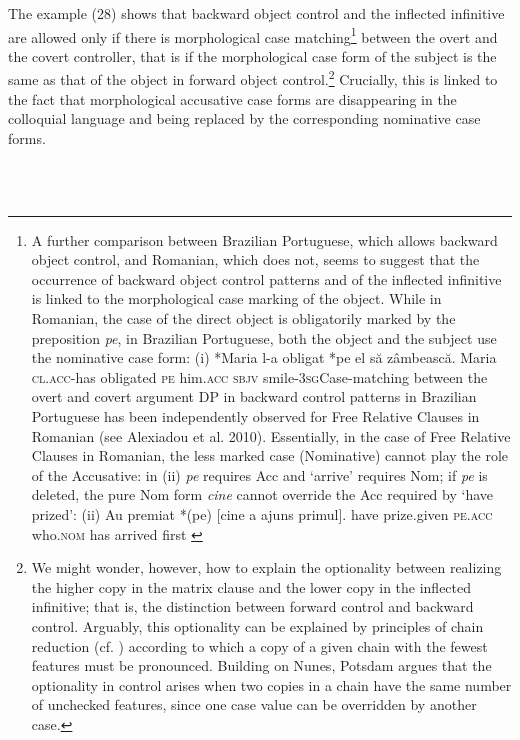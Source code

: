 \documentclass[output=paper]{langsci/langscibook}
\begin{document}
The example (28) shows that backward object control and the inflected infinitive are allowed only if there is morphological case matching\footnote{A further comparison between Brazilian Portuguese, which allows backward object control, and Romanian, which does not, seems to suggest that the occurrence of backward object control patterns and of the inflected infinitive is linked to the morphological case marking of the object. While in Romanian, the case of the direct object is obligatorily marked by the preposition \textit{pe}, in Brazilian Portuguese, both the object and the subject use the nominative case form: (i)  *Maria  l-a     obligat     *pe el            să      zâmbească.  Maria  \textsc{cl.acc}{}-has        obligated     \textsc{pe} him\textsc{.acc} \textsc{sbjv} smile\textsc{{}-3sg}Case-matching between the overt and covert argument DP in backward control patterns in Brazilian Portuguese has been independently observed for Free Relative Clauses in Romanian (see Alexiadou et al. 2010). Essentially, in the case of Free Relative Clauses in Romanian, the less marked case (Nominative) cannot play the role of the Accusative: in (ii) \textit{pe} requires Acc and ‘arrive’ requires Nom; if \textit{pe} is deleted, the pure Nom form \textit{cine} cannot override the Acc required by ‘have prized’: (ii)  Au    premiat       *(pe)     [cine        a     ajuns    primul].  have prize.given   \textsc{pe.acc}  who.\textsc{nom} has arrived first \citep{AlexiadouEtAl2010}} between the overt and the covert controller, that is if the morphological case form of the subject is the same as that of the object in forward object control.\footnote{We might wonder, however, how to explain the optionality between realizing the higher copy in the matrix clause and the lower copy in the inflected infinitive; that is, the distinction between forward control and backward control. Arguably, this optionality can be explained by principles of chain reduction (cf. \citealt{Nunes2004}) according to which a copy of a given chain with the fewest features must be pronounced. Building on Nunes, Potsdam argues that the optionality in control arises when two copies in a chain have the same number of unchecked features, since one case value can be overridden by another case.} Crucially, this is linked to the fact that morphological accusative case forms are disappearing in the colloquial language and being replaced by the corresponding nominative case forms.

\ea%
    \label{ex:key:29}
    \gll\\
        \\
    \glt
    \z
\end{document}
